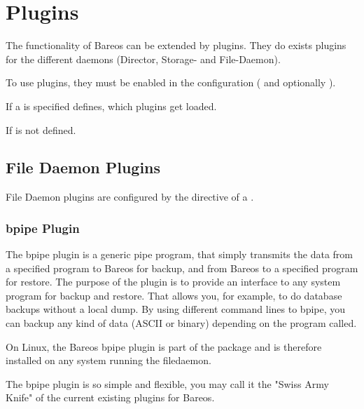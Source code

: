 \chapter{Plugins}

The functionality of Bareos can be extended by plugins.
They do exists plugins for the different daemons (Director, Storage- and File-Daemon).

To use plugins, they must be enabled in the configuration ( and optionally ).

If a  is specified
 defines, which plugins get loaded.

If  is not defined.

\section{File Daemon Plugins}
\label{fdPlugins}

File Daemon plugins are configured by the  directive of a .


\subsection{bpipe Plugin}
\label{bpipe}

The bpipe plugin is a generic pipe program, that simply transmits the data from a specified program to Bareos for backup, and
from Bareos to a specified program for restore. The purpose of the plugin is to provide an interface to any system program
for backup and restore. That allows you, for example, to do database backups without a local dump. By using different command 
lines to bpipe, you can backup any kind of data (ASCII or binary) depending on the program called.

On Linux, the Bareos bpipe plugin is part of the  package and is therefore installed on any system running the filedaemon.

The bpipe plugin is so simple and flexible, you may call it the 
"Swiss Army Knife" of the current existing plugins for Bareos.

